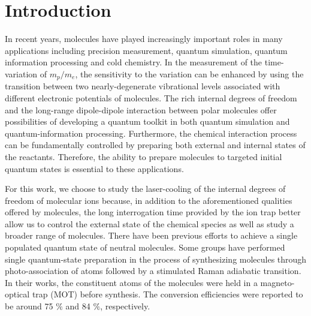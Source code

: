 \documentclass[nofootinbib,aip,jcp,reprint]{revtex4-1}
\begin{document}
\section{Introduction}
In recent years, molecules have played increasingly important roles in many applications including precision measurement\cite{kobayashi2019measurement, andreev2018improved, biesheuvel2016probing}, quantum simulation\cite{ohmori2017special}, quantum information processing\cite{grandstrand:2004, soderberg2009ultracold} and cold chemistry\cite{balakrishnan2016perspective, bohn2017cold}. In the measurement of the time-variation of $m_p/m_e$, the sensitivity to the variation can be enhanced by using the transition between two nearly-degenerate vibrational levels associated with different electronic potentials of molecules\cite{demille2008enhanced, kobayashi2019measurement}. The rich internal degrees of freedom and the long-range dipole-dipole interaction between polar molecules offer possibilities of developing a quantum toolkit in both quantum simulation and quantum-information processing\cite{wei2011entanglement}. Furthermore, the chemical interaction process can be fundamentally controlled by preparing both external and internal states of the reactants\cite{de2011controlling}. Therefore, the ability to prepare molecules to targeted initial quantum states is essential to these applications.\par
For this work, we choose to study the laser-cooling of the internal degrees of freedom of molecular ions because, in addition to the aforementioned qualities offered by molecules, the long interrogation time provided by the ion trap better allow us to control the external state of the chemical species as well as study a broader range of molecules.
There have been previous efforts to achieve a single populated quantum state of neutral molecules. Some groups have performed single quantum-state preparation in the process of synthesizing molecules through photo-association of atoms followed by a stimulated Raman adiabatic transition\cite{ospelkaus2008efficient, park2015ultracold}. In their works, the constituent atoms of the molecules were held in a magneto-optical trap (MOT) before synthesis. The conversion efficiencies were reported to be around 75 $\%$ and 84 $\%$, respectively.\par
\end{document}
